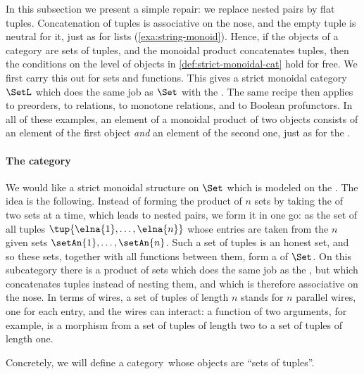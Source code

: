 In this subsection we present a simple repair: we replace nested pairs by flat tuples.
Concatenation of tuples is associative on the nose, and the empty tuple is neutral for it, just as for lists (\cref{exa:string-monoid}).
Hence, if the objects of a category are sets of tuples, and the monoidal product concatenates tuples, then the conditions on the level of objects in \cref{def:strict-monoidal-cat} hold for free.
We first carry this out for sets and functions.
This gives a strict monoidal category $\SetL$ which does the same job as $\Set$ with the .
The same recipe then applies to preorders, to relations, to monotone relations, and to Boolean profunctors.
In all of these examples, an element of a monoidal product of two objects consists of an element of the first object \emph{and} an element of the second one, just as for the .

\paragraph{The category \SetL}
\label{sec:cartcatset}

We would like a strict monoidal structure on $\Set$ which is modeled on the .
The idea is the following.
Instead of forming the product of $n$ sets by taking the  of two sets at a time, which leads to nested pairs, we form it in one go: as the set of all tuples $\tup{\elna{1}, \ldots, \elna{n}}$ whose entries are taken from the $n$ given sets $\setAn{1}, \ldots, \setAn{n}$.
Such a set of tuples is an honest set, and so these sets, together with all functions between them, form a  of $\Set$.
On this subcategory there is a product of sets which does the same job as the , but which concatenates tuples instead of nesting them, and which is therefore associative on the nose.
In terms of wires, a set of tuples of length $n$ stands for $n$ parallel wires, one for each entry, and the wires can interact: a function of two arguments, for example, is a morphism from a set of tuples of length two to a set of tuples of length one.

Concretely, we will define a category~\SetL whose objects are ``sets of tuples''.

